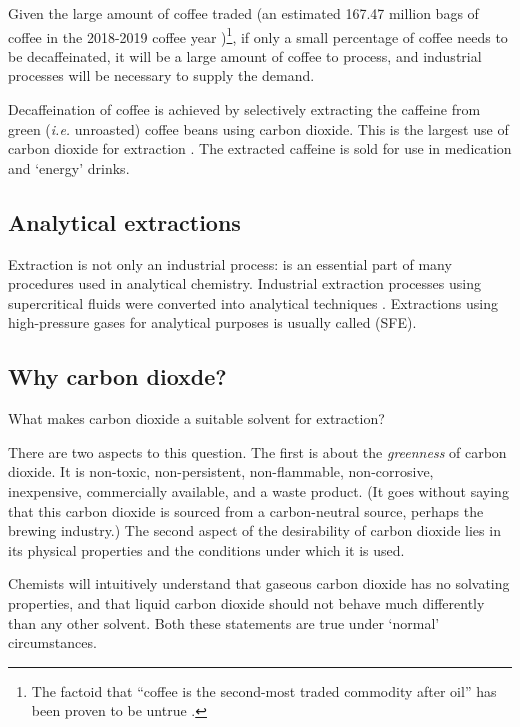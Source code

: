 Given the large amount of coffee traded (an estimated 167.47 million bags of
coffee in the 2018-2019 coffee year \autocite{Coffee2018})\footnote{The factoid
that ``coffee is the second-most traded commodity after oil'' has been proven to
be untrue \autocite{Greenberg2017}.}, if only a small percentage of coffee needs
to be decaffeinated, it will be a large amount of coffee to process, and
industrial processes will be necessary to supply the demand.

Decaffeination of coffee is achieved by selectively extracting the caffeine from
green (\textit{i.e.} unroasted) coffee beans using carbon dioxide. This is the
largest use of carbon dioxide for extraction \autocite{Ramalakshmi1999}. The
extracted caffeine is sold for use in medication and `energy' drinks.

\subsection{Analytical extractions}

Extraction is not only an industrial process: is an essential part of many
procedures used in analytical chemistry. Industrial extraction processes using
supercritical fluids were converted into analytical techniques
\autocite{Taylor2013}. Extractions using high-pressure gases for analytical
purposes is usually called  (SFE).

\subsection{Why carbon dioxde?}

What makes carbon dioxide a suitable solvent for extraction?

There are two aspects to this question. The first is about the
\textit{greenness} of carbon dioxide. It is non-toxic, non-persistent,
non-flammable, non-corrosive, inexpensive, commercially available, and a waste
product. (It goes without saying that this carbon dioxide is sourced from a
carbon-neutral source, perhaps the brewing industry.) The second aspect of the
desirability of carbon dioxide lies in its physical properties and the
conditions under which it is used.

Chemists will intuitively understand that gaseous carbon dioxide has no solvating
properties, and that liquid carbon dioxide should not behave much differently
than any other solvent. Both these statements are true under `normal' circumstances.

